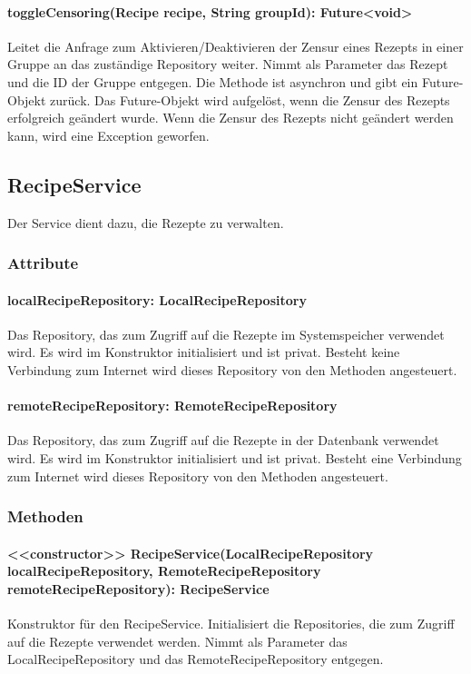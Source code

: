 \documentclass[parskip=full]{scrartcl}
\begin{document}
\paragraph{toggleCensoring(Recipe recipe, String groupId): Future<void>}
Leitet die Anfrage zum Aktivieren/Deaktivieren der Zensur eines Rezepts in einer Gruppe an das zuständige Repository weiter. Nimmt als Parameter das Rezept und die ID der Gruppe entgegen. Die Methode ist asynchron und gibt ein Future-Objekt zurück. Das Future-Objekt wird aufgelöst, wenn die Zensur des Rezepts erfolgreich geändert wurde. Wenn die Zensur des Rezepts nicht geändert werden kann, wird eine Exception geworfen.

\subsection{RecipeService}
Der Service dient dazu, die Rezepte zu verwalten.
\subsubsection{Attribute}
\paragraph{localRecipeRepository: LocalRecipeRepository}
Das Repository, das zum Zugriff auf die Rezepte im Systemspeicher verwendet wird. Es wird im Konstruktor initialisiert und ist privat. Besteht keine Verbindung zum Internet wird dieses Repository von den Methoden angesteuert.
\paragraph{remoteRecipeRepository: RemoteRecipeRepository}
Das Repository, das zum Zugriff auf die Rezepte in der Datenbank verwendet wird. Es wird im Konstruktor initialisiert und ist privat. Besteht eine Verbindung zum Internet wird dieses Repository von den Methoden angesteuert.
\subsubsection{Methoden}
\paragraph{<<constructor>> RecipeService(LocalRecipeRepository localRecipeRepository, RemoteRecipeRepository remoteRecipeRepository): RecipeService}
Konstruktor für den RecipeService. Initialisiert die Repositories, die zum Zugriff auf die Rezepte verwendet werden. Nimmt als Parameter das LocalRecipeRepository und das RemoteRecipeRepository entgegen.
\end{document}

